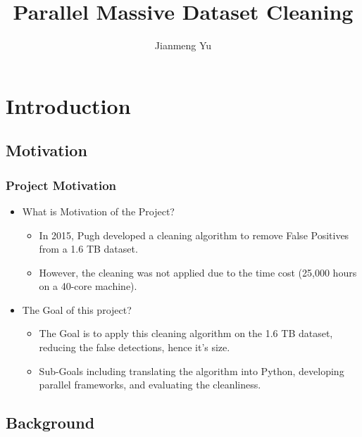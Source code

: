 \documentclass{beamer}[fullspacing]
\author{Jianmeng Yu}
\institute{Supervised by: Bob Fisher}
\title{Parallel Massive Dataset Cleaning}
\date{}
\begin{document}
\begin{frame}
\titlepage
\end{frame}


\begin{frame}
\tableofcontents
\end{frame}


\section{Introduction}

\subsection{Motivation}
\begin{frame}
\frametitle{Project Motivation}

\begin{itemize}
\item What is Motivation of the Project?
\begin{itemize}
\item In 2015, Pugh\cite{Pugh} developed a cleaning algorithm to remove False Positives from a 1.6 TB dataset.
\item However, the cleaning was not applied due to the time cost (25,000 hours on a 40-core machine)\cite{Yu}.
\end{itemize}
\item The Goal of this project?
\begin{itemize}
\item The Goal is to apply this cleaning algorithm on the 1.6 TB dataset, reducing the false detections, hence it's size.
\item Sub-Goals including translating the algorithm into Python, developing parallel frameworks, and evaluating the cleanliness.
\end{itemize}
\end{itemize}

\end{frame}



\subsection{Background}
\end{document}
